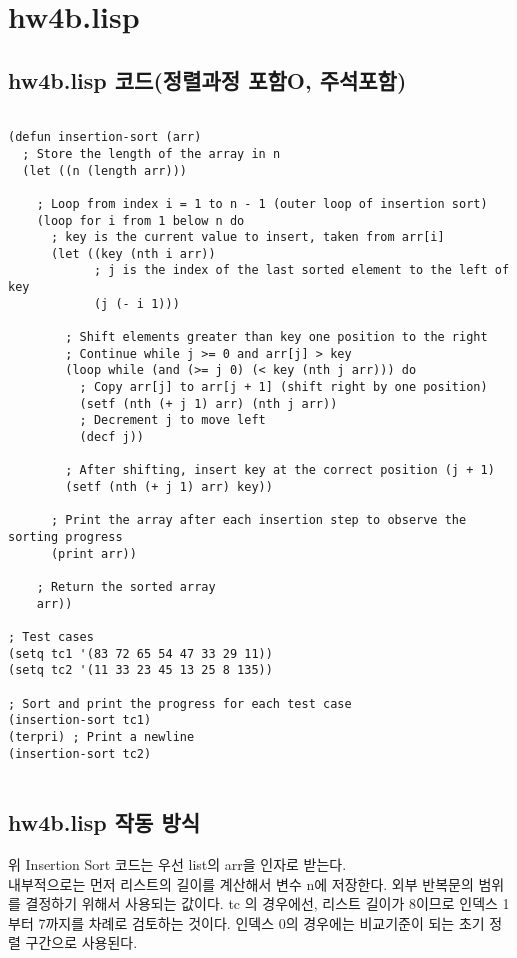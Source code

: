 \documentclass{article}
\begin{document}
\section{hw4b.lisp}
\subsection{hw4b.lisp 코드(정렬과정 포함O, 주석포함)}
\begin{lstlisting}

(defun insertion-sort (arr)
  ; Store the length of the array in n
  (let ((n (length arr)))
  
    ; Loop from index i = 1 to n - 1 (outer loop of insertion sort)
    (loop for i from 1 below n do
      ; key is the current value to insert, taken from arr[i]
      (let ((key (nth i arr))
            ; j is the index of the last sorted element to the left of key
            (j (- i 1)))
        
        ; Shift elements greater than key one position to the right
        ; Continue while j >= 0 and arr[j] > key
        (loop while (and (>= j 0) (< key (nth j arr))) do
          ; Copy arr[j] to arr[j + 1] (shift right by one position)
          (setf (nth (+ j 1) arr) (nth j arr))
          ; Decrement j to move left
          (decf j))

        ; After shifting, insert key at the correct position (j + 1)
        (setf (nth (+ j 1) arr) key))
      
      ; Print the array after each insertion step to observe the sorting progress
      (print arr))

    ; Return the sorted array
    arr))

; Test cases
(setq tc1 '(83 72 65 54 47 33 29 11))
(setq tc2 '(11 33 23 45 13 25 8 135))

; Sort and print the progress for each test case
(insertion-sort tc1)
(terpri) ; Print a newline
(insertion-sort tc2)


\end{lstlisting}
\newpage


\subsection{hw4b.lisp 작동 방식}

위 Insertion Sort 코드는 우선 list의 arr을 인자로 받는다. \\
내부적으로는 먼저 리스트의 길이를 계산해서 변수 n에 저장한다. 외부 반복문의 범위를 결정하기 위해서 사용되는 값이다. tc 의 경우에선, 리스트 길이가 8이므로  인덱스 1부터 7까지를 차례로 검토하는 것이다. 인덱스 0의 경우에는 비교기준이 되는 초기 정렬 구간으로 사용된다. \\ \\
\end{document}
